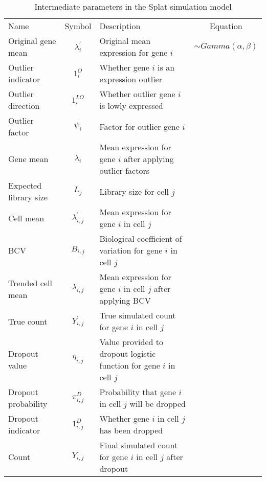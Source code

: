 \begin{table} 
    \begin{tabular}{ l c l c }
        Name & Symbol & Description & Equation \\
        Original gene mean & $\lambda^{'}_i$ & Original mean expression for gene $i$ & $\sim Gamma(\alpha, \beta)$\\
        Outlier indicator & $1^{O}_i$ & Whether gene $i$ is an expression outlier & \\ 
        Outlier direction & $1^{LO}_i$ & Whether outlier gene $i$ is lowly expressed & \\
        Outlier factor & $\psi_i$ & Factor for outlier gene $i$ & \\
        Gene mean & $\lambda_i$ & Mean expression for gene $i$ after applying outlier factors & \\
        Expected library size & $L_j$ & Library size for cell $j$ & \\
        Cell mean & $\lambda^{'}_{i,j}$ & Mean expression for gene $i$ in cell $j$ & \\
        BCV & $B_{i,j}$ & Biological coefficient of variation for gene $i$ in cell $j$ & \\
        Trended cell mean & $\lambda_{i,j}$ & Mean expression for gene $i$ in cell $j$ after applying BCV & \\
        True count & $Y^{'}_{i,j}$ & True simulated count for gene $i$ in cell $j$ & \\
        Dropout value & $\eta_{i,j}$ & Value provided to dropout logistic function for gene $i$ in cell $j$ & \\
        Dropout probability & $\pi^{D}_{i,j}$ & Probability that gene $i$ in cell $j$ will be dropped & \\
        Dropout indicator & $1^{D}_{i,j}$ & Whether gene $i$ in cell $j$ has been dropped & \\
        Count & $Y_{i,j}$ & Final simulated count for gene $i$ in cell $j$ after dropout & \\
    \end{tabular} 
    \caption{Intermediate parameters in the Splat simulation model} 
\end{table}